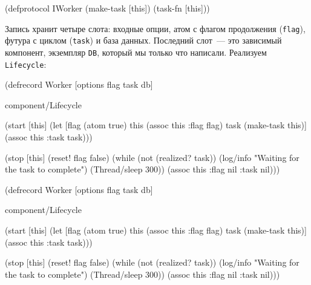 \begin{english}
  \begin{clojure}
(defprotocol IWorker
  (make-task [this])
  (task-fn [this]))
  \end{clojure}
\end{english}

Запись хранит четыре слота: входные опции, атом с флагом продолжения
(\verb|flag|), футура с циклом (\verb|task|) и база данных. Последний слот~---
это зависимый компонент, экземпляр \verb|DB|, который мы только что
написали. Реализуем \verb|Lifecycle|:

\ifnarrow

\begin{english}
  \begin{clojure/lines}
(defrecord Worker
  [options flag task db]

  component/Lifecycle

  (start [this]
    (let [flag (atom true)
          this (assoc this :flag flag)
          task (make-task this)]
      (assoc this :task task)))

  (stop [this]
    (reset! flag false)
    (while (not (realized? task))
      (log/info
        "Waiting for
             the task to complete")
      (Thread/sleep 300))
    (assoc this :flag nil :task nil)))
  \end{clojure/lines}
\end{english}

\else

\ifafive

\begin{english}
  \begin{clojure/lines}
(defrecord Worker
  [options flag task db]

  component/Lifecycle

  (start [this]
    (let [flag (atom true)
          this (assoc this :flag flag)
          task (make-task this)]
      (assoc this :task task)))
  \end{clojure/lines}
\end{english}

\pagebreak

\begin{english}
  \begin{clojure/lines}
  (stop [this]
    (reset! flag false)
    (while (not (realized? task))
      (log/info "Waiting for the task to complete")
      (Thread/sleep 300))
    (assoc this :flag nil :task nil)))
  \end{clojure/lines}
\end{english}

